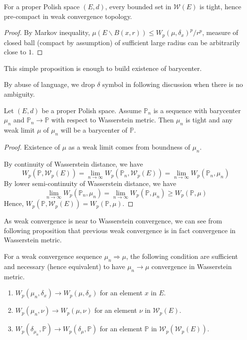 \begin{prop}
	For a proper Polish space $(E,d)$, every bounded set in $\mathcal{W}(E)$ is tight, hence pre-compact in weak convergence topology.
\end{prop}
\begin{proof}
	By Markov inequality, $\mu(E\backslash B(x,r)) \leq W_p(\mu, \delta_x)^p/r^p$, measure of closed ball (compact by assumption) of sufficient large radius can be arbitrarily close to $1$.
\end{proof}

This simple proposition is enough to build existence of barycenter.

By abuse of language, we drop $\delta$ symbol in following discussion when there is no ambiguity.
\begin{thm}
	Let $(E,d)$ be a proper Polish space. Assume $\mathbb{P}_n$ is a sequence with barycenter $\mu_n$ and $\mathbb{P}_n \rightarrow \mathbb{P}$ with respect to Wasserstein metric. Then $\mu_n$ is tight and any weak limit $\mu$ of $\mu_n$ will be a barycenter of $\mathbb{P}$.
\end{thm}

\begin{proof}
	Existence of $\mu$ as a weak limit comes from boundness of $\mu_n$.

	By continuity of Wasserstein distance, we have
	\[
		W_p(\mathbb{P}, \mathcal{W}_p(E)) = \lim_{n \rightarrow \infty}W_p(\mathbb{P}_n, \mathcal{W}_p(E))=\lim_{n \rightarrow \infty}W_p(\mathbb{P}_n, \mu_n)
	\]
	By lower semi-continuity of Wasserstein distance, we have
	\[
		\lim_{n \rightarrow \infty}W_p(\mathbb{P}_n, \mu_n)=\lim_{n \rightarrow \infty}W_p(\mathbb{P}, \mu_n)\geq W_p(\mathbb{P}, \mu)
	\]
	Hence, $W_p(\mathbb{P}, \mathcal{W}_p(E)) =W_p(\mathbb{P}, \mu)$.
\end{proof}

As weak convergence is near to Wasserstein convergence, we can see from following proposition that previous weak convergence is in fact convergence in Wasserstein metric.

\begin{prop}
	For a weak convergence sequence $\mu_n \Rightarrow \mu$, the following condition are sufficient and necessary (hence equivalent) to have $\mu_n \rightarrow \mu$ convergence in Wasserstein metric.
	\begin{enumerate}
		\item $W_p(\mu_n, \delta_x) \rightarrow W_p(\mu, \delta_x)$ for an element $x$ in $E$.
		\item $W_p(\mu_n, \nu) \rightarrow W_p(\mu, \nu)$ for an element $\nu$ in $\mathcal{W}_p(E)$.
		\item $W_p(\delta_{\mu_n}, \mathbb{P}) \rightarrow W_p(\delta_\mu, \mathbb{P})$ for an element $\mathbb{P}$ in $\mathcal{W}_p(\mathcal{W}_p(E))$.
	\end{enumerate}
\end{prop}

